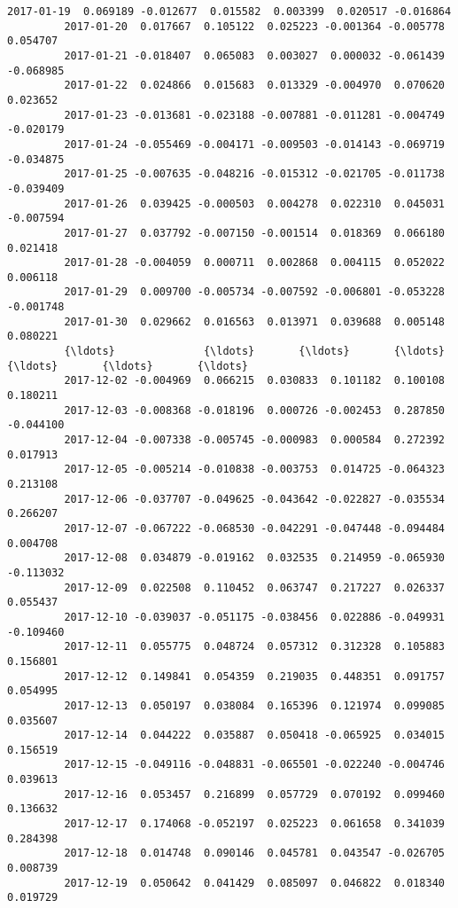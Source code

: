 \documentclass[11pt]{article}
\begin{document}
\begin{Verbatim}[commandchars=\\\{\}]
         2017-01-19  0.069189 -0.012677  0.015582  0.003399  0.020517 -0.016864   
         2017-01-20  0.017667  0.105122  0.025223 -0.001364 -0.005778  0.054707   
         2017-01-21 -0.018407  0.065083  0.003027  0.000032 -0.061439 -0.068985   
         2017-01-22  0.024866  0.015683  0.013329 -0.004970  0.070620  0.023652   
         2017-01-23 -0.013681 -0.023188 -0.007881 -0.011281 -0.004749 -0.020179   
         2017-01-24 -0.055469 -0.004171 -0.009503 -0.014143 -0.069719 -0.034875   
         2017-01-25 -0.007635 -0.048216 -0.015312 -0.021705 -0.011738 -0.039409   
         2017-01-26  0.039425 -0.000503  0.004278  0.022310  0.045031 -0.007594   
         2017-01-27  0.037792 -0.007150 -0.001514  0.018369  0.066180  0.021418   
         2017-01-28 -0.004059  0.000711  0.002868  0.004115  0.052022  0.006118   
         2017-01-29  0.009700 -0.005734 -0.007592 -0.006801 -0.053228 -0.001748   
         2017-01-30  0.029662  0.016563  0.013971  0.039688  0.005148  0.080221   
         {\ldots}              {\ldots}       {\ldots}       {\ldots}       {\ldots}       {\ldots}       {\ldots}   
         2017-12-02 -0.004969  0.066215  0.030833  0.101182  0.100108  0.180211   
         2017-12-03 -0.008368 -0.018196  0.000726 -0.002453  0.287850 -0.044100   
         2017-12-04 -0.007338 -0.005745 -0.000983  0.000584  0.272392  0.017913   
         2017-12-05 -0.005214 -0.010838 -0.003753  0.014725 -0.064323  0.213108   
         2017-12-06 -0.037707 -0.049625 -0.043642 -0.022827 -0.035534  0.266207   
         2017-12-07 -0.067222 -0.068530 -0.042291 -0.047448 -0.094484  0.004708   
         2017-12-08  0.034879 -0.019162  0.032535  0.214959 -0.065930 -0.113032   
         2017-12-09  0.022508  0.110452  0.063747  0.217227  0.026337  0.055437   
         2017-12-10 -0.039037 -0.051175 -0.038456  0.022886 -0.049931 -0.109460   
         2017-12-11  0.055775  0.048724  0.057312  0.312328  0.105883  0.156801   
         2017-12-12  0.149841  0.054359  0.219035  0.448351  0.091757  0.054995   
         2017-12-13  0.050197  0.038084  0.165396  0.121974  0.099085  0.035607   
         2017-12-14  0.044222  0.035887  0.050418 -0.065925  0.034015  0.156519   
         2017-12-15 -0.049116 -0.048831 -0.065501 -0.022240 -0.004746  0.039613   
         2017-12-16  0.053457  0.216899  0.057729  0.070192  0.099460  0.136632   
         2017-12-17  0.174068 -0.052197  0.025223  0.061658  0.341039  0.284398   
         2017-12-18  0.014748  0.090146  0.045781  0.043547 -0.026705  0.008739   
         2017-12-19  0.050642  0.041429  0.085097  0.046822  0.018340  0.019729   

\end{Verbatim}
\end{document}

